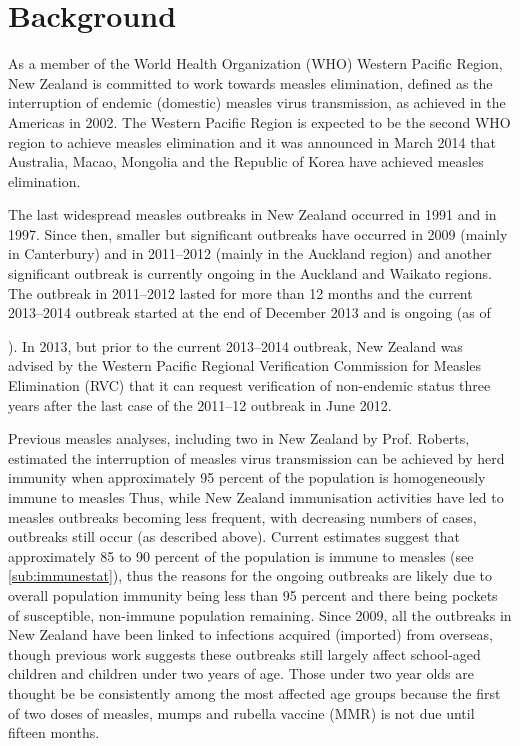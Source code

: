 \documentclass{article}
\begin{document}
\section{Background}

As a member of the World Health Organization (WHO) Western Pacific Region, New Zealand is committed to work towards measles elimination, defined as the interruption of endemic (domestic) measles virus transmission, as achieved in the Americas in 2002. The Western Pacific Region is expected to be the second WHO region to  achieve measles elimination and it was announced in March 2014 that Australia, Macao, Mongolia and the Republic of Korea have achieved measles elimination.

The last widespread measles outbreaks in New Zealand occurred in 1991 and in 1997. Since then, smaller but significant outbreaks have occurred in 2009 (mainly in Canterbury) and in 2011--2012 (mainly in the Auckland region) and another significant outbreak is currently ongoing in the Auckland and Waikato regions. The outbreak in 2011--2012 lasted for more than 12 months and the current 2013--2014 outbreak started at the end of December 2013 and is ongoing (as of \date{3 July 2014}). In 2013, but prior to the current 2013--2014 outbreak, New Zealand was advised by the Western Pacific Regional Verification Commission for Measles Elimination (RVC) that it can request verification of non-endemic status three years after the last case of the 2011--12 outbreak in June 2012.

Previous measles analyses, including two in New Zealand by Prof. Roberts, estimated the interruption of measles virus transmission can be achieved by herd immunity when approximately 95 percent of the population is homogeneously immune to measles %
Thus, while New Zealand immunisation activities have led to measles outbreaks becoming less frequent, with decreasing numbers of cases, outbreaks still occur (as described above). Current estimates suggest that approximately 85 to 90 percent of the population is immune to measles (see \autoref{sub:immunestat}), thus the reasons for the ongoing outbreaks are likely due to overall population immunity being less than 95 percent and there being pockets of susceptible, non-immune population remaining. Since 2009, all the outbreaks in New Zealand have been linked to infections acquired (imported) from overseas, though previous work suggests these outbreaks still largely affect school-aged children and children under two years of age. Those under two year olds are thought be be consistently among the most affected age groups because the first of two doses of measles, mumps and rubella vaccine (MMR) is not due until fifteen months.
\end{document}
